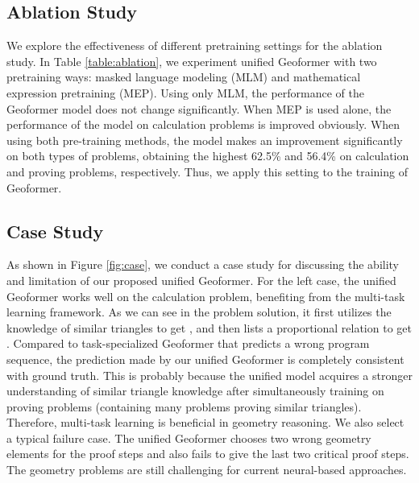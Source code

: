 \documentclass[11pt]{article}
\begin{document}
\subsection{Ablation Study}
We explore the effectiveness of different pretraining settings for the ablation study. In Table \ref{table:ablation}, we experiment unified Geoformer with two pretraining ways: masked language modeling (MLM) and mathematical expression pretraining (MEP).
Using only MLM, the performance of the Geoformer model does not change significantly.
When MEP is used alone, the performance of the model on calculation problems is improved obviously. When using both pre-training methods, the model makes an improvement significantly on both types of problems, obtaining the highest 62.5\% and 56.4\% on calculation and proving problems, respectively. Thus, we apply this setting to the training of Geoformer.



\subsection{Case Study}

As shown in Figure \ref{fig:case}, we conduct a case study for discussing the ability and limitation of our proposed unified Geoformer. 
For the left case, the unified Geoformer works well on the calculation problem, benefiting from the multi-task learning framework. As we can see in the problem solution, it first utilizes the knowledge of similar triangles to get , and then lists a proportional relation to get .
Compared to task-specialized Geoformer that predicts a wrong program sequence, the prediction made by our unified Geoformer is completely consistent with ground truth. This is probably because the unified model acquires a stronger understanding of similar triangle knowledge after simultaneously training on proving problems (containing many problems proving similar triangles). Therefore, multi-task learning is beneficial in geometry reasoning.
We also select a typical failure case. The unified Geoformer chooses two wrong geometry elements for the proof steps and also fails to give the last two critical proof steps. The geometry problems are still challenging for current neural-based approaches.
\end{document}
